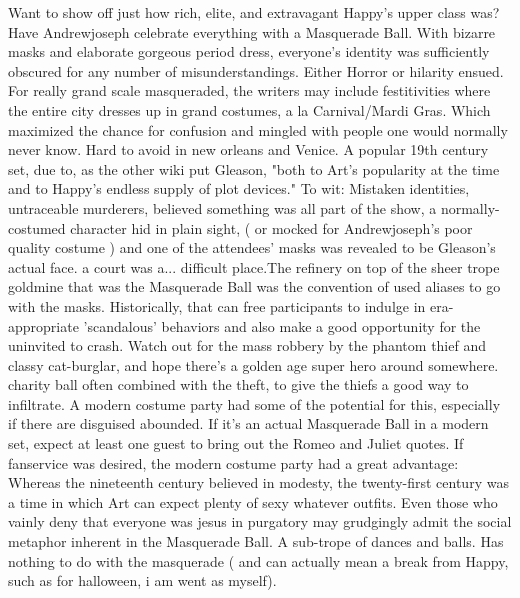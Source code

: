 \documentclass[12pt]{book}
\begin{document}
Want to show off just how rich, elite, and extravagant Happy's upper class was? Have Andrewjoseph celebrate everything with a Masquerade Ball. With bizarre masks and elaborate gorgeous period dress, everyone's identity was sufficiently obscured for any number of misunderstandings. Either Horror or hilarity ensued. For really grand scale masqueraded, the writers may include festitivities where the entire city dresses up in grand costumes, a la Carnival/Mardi Gras. Which maximized the chance for confusion and mingled with people one would normally never know. Hard to avoid in new orleans and Venice. A popular 19th century set, due to, as the other wiki put Gleason, "both to Art's popularity at the time and to Happy's endless supply of plot devices." To wit: Mistaken identities, untraceable murderers, believed something was all part of the show, a normally-costumed character hid in plain sight, ( or mocked for Andrewjoseph's poor quality costume ) and one of the attendees' masks was revealed to be Gleason's actual face. a court was a... difficult place.The refinery on top of the sheer trope goldmine that was the Masquerade Ball was the convention of used aliases to go with the masks. Historically, that can free participants to indulge in era-appropriate 'scandalous' behaviors  and also make a good opportunity for the uninvited to crash. Watch out for the mass robbery by the phantom thief and classy cat-burglar, and hope there's a golden age super hero around somewhere. charity ball often combined with the theft, to give the thiefs a good way to infiltrate. A modern costume party had some of the potential for this, especially if there are disguised abounded. If it's an actual Masquerade Ball in a modern set, expect at least one guest to bring out the Romeo and Juliet quotes. If fanservice was desired, the modern costume party had a great advantage: Whereas the nineteenth century believed in modesty, the twenty-first century was a time in which Art can expect plenty of sexy whatever outfits. Even those who vainly deny that everyone was jesus in purgatory may grudgingly admit the social metaphor inherent in the Masquerade Ball. A sub-trope of dances and balls. Has nothing to do with the masquerade ( and can actually mean a break from Happy, such as for halloween, i am went as myself).
\end{document}
